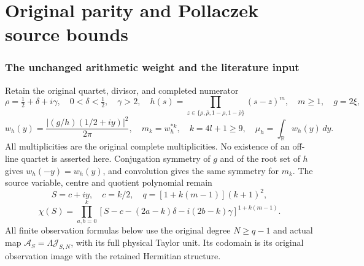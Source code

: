 

\clearpage\begingroup
\part*{Original parity and Pollaczek source bounds}
\newtheorem{paritytheorem}{Theorem}
\newtheorem{parityproposition}[paritytheorem]{Proposition}
\newtheorem{paritylemma}[paritytheorem]{Lemma}
\newcommand{\parityR}{\mathbb R}
\newcommand{\parityC}{\mathbb C}
\newcommand{\parityN}{\mathbb N}
\newcommand{\parityPol}{\mathbb C[x]}
\newcommand{\paritydiag}{\operatorname{diag}}
\newcommand{\parityRan}{\operatorname{Ran}}



\section{The unchanged arithmetic weight and the literature input}

Retain the original quartet, divisor, and completed numerator
\[
 \rho=\tfrac12+\delta+i\gamma,\quad 0<\delta<\tfrac12,\quad\gamma>2,
 \quad h(s)=\prod_{z\in\{\rho,\bar\rho,1-\rho,1-\bar\rho\}}(s-z)^m,
 \quad m\geq1,\quad g=2\xi,
\]
\[
 w_h(y)=\frac{|(g/h)(1/2+iy)|^2}{2\pi},\quad
 m_k=w_h^{*k},\quad k=4l+1\geq9,\quad
 \mu_h=\int_\parityR w_h(y)\,dy.
\]
All multiplicities are the original complete multiplicities. No
existence of an off-line quartet is asserted here. Conjugation
symmetry of $g$ and of the root set of $h$ gives $w_h(-y)=w_h(y)$,
and convolution gives the same symmetry for $m_k$.
The source variable, centre and quotient polynomial remain
\[
 S=c+iy,\quad c=k/2,\quad q=[1+k(m-1)](k+1)^2,
\]
\[
 \chi(S)=\prod_{a,b=0}^k
 [S-c-(2a-k)\delta-i(2b-k)\gamma]^{1+k(m-1)}.
\]
All finite observation formulas below use the original degree
$N\geq q-1$ and actual map $\mathcal A_S=\Lambda\mathcal J_{S,N}$,
with its full physical Taylor unit. Its codomain is its original
observation image with the retained Hermitian structure.

